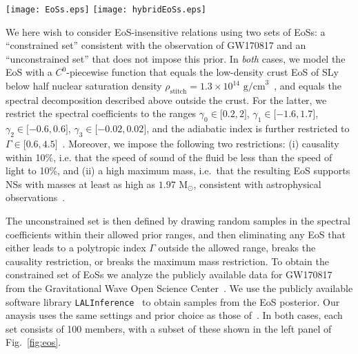 \documentclass[prd,twocolumn,nofootinbib,superscriptaddress,amsmath,amssymb]{revtex4-1}
\begin{document}
\begin{figure*}
\begin{center} 
\texttt{[image: EoSs.eps]}
\texttt{[image: hybridEoSs.eps]}
\end{center}
\caption{(Color Online) Left: Small representative samples of the unconstrained (dotted) and constrained (solid) sets, together with the 90\% marginalized posterior distribution from the observation of GW170817 (cyan shaded region)~\cite{LIGO:posterior}. There is significantly less variability in the constrained set of EoSs due to the requirement that they be consistent with the GW170817 observation. Right: EoSs for ACS and ACB hybrid stars~\cite{Paschalidis2018}, each transitioning from a hadronic branch (corresponding to a pure hadronic-matter NS) into a quark-matter branch (quark-matter inner core surrounded by hadronic matter) at various transition pressures $P_{\text{tr}}$.
}
\label{fig:eos}
\end{figure*} 

We here wish to consider EoS-insensitive relations using two sets of EoSs: a ``constrained set'' consistent with the observation of GW170817 and an ``unconstrained set'' that does not impose this prior. In \emph{both} cases, we model the EoS with a $C^{0}$-piecewise function that equals the low-density crust EoS of SLy~\cite{Douchin:2001sv} below half nuclear saturation density $\rho_{\text{stitch}}=1.3 \times 10^{14} \text{ g/cm}^3$~\cite{Read2009}, and equals the spectral decomposition described above outside the crust. For the latter, we restrict the spectral coefficients to the ranges $\gamma_0 \in \lbrack 0.2,2 \rbrack$, $\gamma_1 \in \lbrack -1.6,1.7 \rbrack$, $\gamma_2 \in \lbrack -0.6,0.6 \rbrack$, $\gamma_3 \in \lbrack -0.02,0.02 \rbrack$, and the adiabatic index is further restricted to $\Gamma \in \lbrack 0.6,4.5 \rbrack$~\cite{Lindblom:parameters}. Moreover, we impose the following two restrictions:  (i) causality within 10\%, i.e. that the speed of sound of the fluid be less than the speed of light to 10\%, and (ii) a high maximum mass, i.e.~that the resulting EoS supports NSs with masses at least as high as $1.97 \text{ M}_{\odot}$, consistent with astrophysical observations~\cite{1.97NS,2.01NS,Zhao:massiveNS}. 

The unconstrained set is then defined by drawing random samples in the spectral coefficients within their allowed prior ranges, and then eliminating any EoS that either leads to a polytropic index $\Gamma$ outside the allowed range, breaks the causality restriction, or breaks the maximum mass restriction. 
To obtain the constrained set of EoSs we analyze the publicly available data for GW170817 from the Gravitational Wave Open Science Center~\cite{GWOSC,Vallisneri:2014vxa}. We use the publicly available software library {\tt LALInference}~\cite{Veitch:2014wba,lalinference_o2} to obtain samples from the EoS posterior. Our anaysis uses the same settings and prior choice as those of~\cite{LIGO:posterior,Carney:2018sdv}. 
In both cases, each set consists of 100 members, with a subset of these shown in the left panel of Fig.~\ref{fig:eos}.
\end{document}

